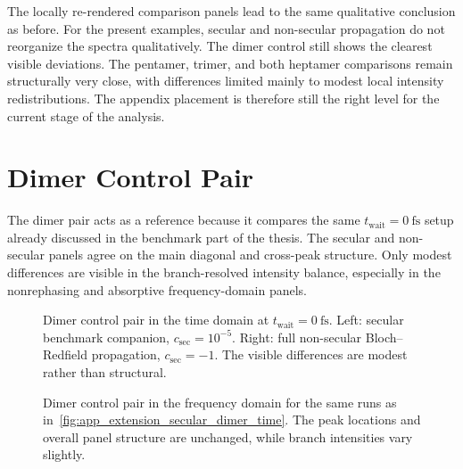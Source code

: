 The locally re-rendered comparison panels lead to the same qualitative
conclusion as before. For the present examples, secular and non-secular
propagation do not reorganize the spectra qualitatively. The dimer control
still shows the clearest visible deviations. The pentamer, trimer, and both
heptamer comparisons remain structurally very close, with differences limited
mainly to modest local intensity redistributions. The appendix placement is
therefore still the right level for the current stage of the analysis.

\section{Dimer Control Pair}
\label{app:sec:extension_secular_dimer}

The dimer pair acts as a reference because it compares the same
\(t_{\mathrm{wait}}=\SI{0}{\femto\second}\) setup already discussed in the
benchmark part of the thesis. The secular and non-secular panels agree on the
main diagonal and cross-peak structure. Only modest differences are visible in
the branch-resolved intensity balance, especially in the nonrephasing and
absorptive frequency-domain panels.

\begin{figure}[htbp]
    \centering
    \begin{minipage}[t]{0.49\linewidth}
        \centering
        \safeplaceholdergraphic[1.18\linewidth]{\dimerSecFullTimePath}
    \end{minipage}\hfill
    \begin{minipage}[t]{0.49\linewidth}
        \centering
        \safeplaceholdergraphic[1.18\linewidth]{\dimerNonSecTimePath}
    \end{minipage}
    \caption{Dimer control pair in the time domain at
    \(t_{\mathrm{wait}}=\SI{0}{\femto\second}\). Left: secular benchmark
    companion, \(c_{\mathrm{sec}}=10^{-5}\). Right: full non-secular
    Bloch--Redfield propagation, \(c_{\mathrm{sec}}=-1\). The visible
    differences are modest rather than structural.}
    \label{fig:app_extension_secular_dimer_time}
\end{figure}

\begin{figure}[htbp]
    \centering
    \begin{minipage}[t]{0.49\linewidth}
        \centering
        \safeplaceholdergraphic[1.18\linewidth]{\dimerSecFullFreqPath}
    \end{minipage}\hfill
    \begin{minipage}[t]{0.49\linewidth}
        \centering
        \safeplaceholdergraphic[1.18\linewidth]{\dimerNonSecFreqPath}
    \end{minipage}
    \caption{Dimer control pair in the frequency domain for the same runs as
    in~\autoref{fig:app_extension_secular_dimer_time}. The peak locations and
    overall panel structure are unchanged, while branch intensities vary
    slightly.}
    \label{fig:app_extension_secular_dimer_freq}
\end{figure}

